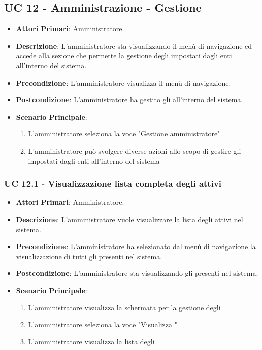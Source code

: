 	\subsection{UC 12 - Amministrazione - Gestione }

		\begin{itemize}
			\item \textbf{Attori Primari}: Amministratore.
			\item \textbf{Descrizione}: L'amministratore sta visualizzando il menù di navigazione ed accede alla sezione che permette la gestione degli  impostati dagli enti all'interno del sistema.
			\item \textbf{Precondizione}: L'amministratore visualizza il menù di navigazione.
			\item \textbf{Postcondizione}: L'amministratore ha gestito gli  all'interno del sistema.
			\item \textbf{Scenario Principale}:
			\begin{enumerate}
				\item{L'amministratore seleziona la voce "Gestione  amministratore"}
				\item{L'amministratore può svolgere diverse azioni allo scopo di gestire gli  impostati dagli enti all'interno del sistema}
			\end{enumerate}	
		\end{itemize}

		\subsubsection{UC 12.1 - Visualizzazione lista completa degli  attivi}
		\begin{itemize}
			\item \textbf{Attori Primari}: Amministratore.
			\item \textbf{Descrizione}: L'amministratore vuole visualizzare la lista degli  attivi nel sistema.
			\item \textbf{Precondizione}: L'amministratore ha selezionato dal menù di navigazione la visualizzazione di tutti gli  presenti nel sistema.
			\item \textbf{Postcondizione}: L'amministratore sta visualizzando gli  presenti nel sistema.
			\item \textbf{Scenario Principale}:
			\begin{enumerate}
				\item{L'amministratore visualizza la schermata per la gestione degli }
				\item{L'amministratore seleziona la voce "Visualizza "}
				\item{L'amministratore visualizza la lista degli }
			\end{enumerate}	
		\end{itemize}

